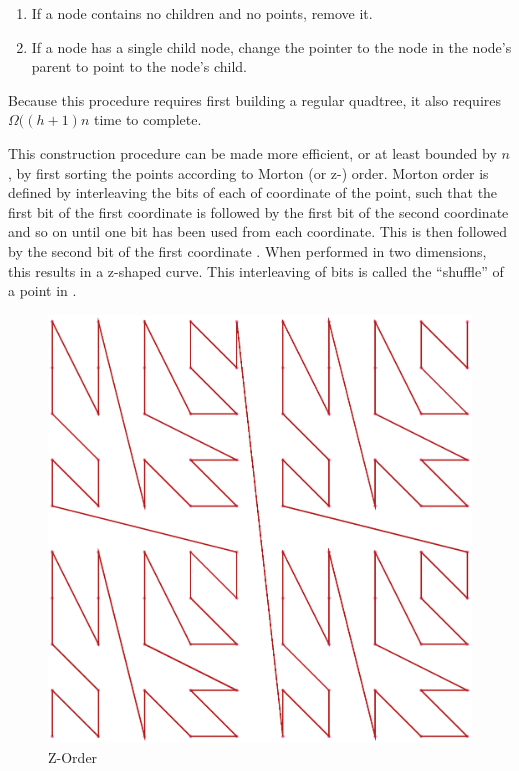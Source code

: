 \documentclass[mcs]{scsthesis}
\begin{document}
\begin{enumerate}
\item If a node contains no children and no points, remove it.
\item If a node has a single child node, change the pointer to the node in the
node's parent to point to the node's child.
\end{enumerate}

Because this procedure requires first building a regular quadtree, it also
requires \(\Omega((h + 1)n\) time to complete.

This construction procedure can be made more efficient, or at least bounded by
\(n\), by first sorting the points according to Morton (or z-) order. Morton order
is defined by interleaving the bits of each of coordinate of the point, such
that the first bit of the first coordinate is followed by the first bit of the
second coordinate and so on until one bit has been used from each coordinate.
This is then followed by the second bit of the first coordinate \cite{morton}.
When performed in two dimensions, this results in a z-shaped curve. This
interleaving of bits is called the ``shuffle'' of a point in \cite{bern}.

\begin{figure}
\begin{center}
\includegraphics[scale=0.35]{diagrams/zorder.eps}
\caption{Z-Order}
\label{fig:z_order}
\end{center}
\end{figure}
\end{document}
